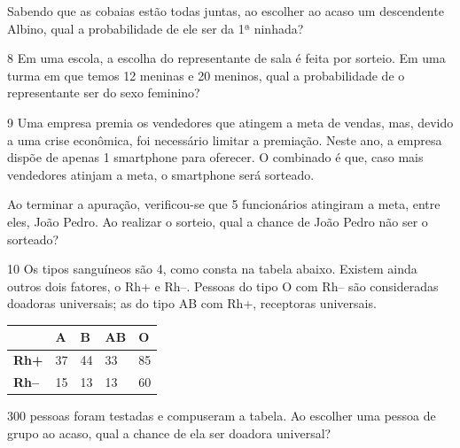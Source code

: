 Sabendo que as cobaias estão todas juntas, ao escolher ao acaso um
descendente Albino, qual a probabilidade de ele ser da 1ª ninhada?

\begin{emptybox}
\end{emptybox}

\num{8} Em uma escola, a escolha do representante de sala é feita por sorteio.
Em uma turma em que temos 12 meninas e 20 meninos, qual a probabilidade
de o representante ser do sexo feminino?

\begin{emptybox}
\end{emptybox}

\num{9} Uma empresa premia os vendedores que atingem a meta de
vendas, mas, devido a uma crise econômica, foi necessário limitar a 
premiação. Neste ano, a empresa dispõe de apenas 1 smartphone para 
oferecer. O combinado é que, caso mais vendedores atinjam 
a meta, o smartphone será sorteado.

Ao terminar a apuração, verificou-se que 5 funcionários atingiram a
meta, entre eles, João Pedro. Ao realizar o sorteio, qual a chance de
João Pedro não ser o sorteado?

\begin{emptybox}
\end{emptybox}

\num{10} Os tipos sanguíneos são 4, como consta na tabela abaixo. Existem ainda
outros dois fatores, o Rh+ e Rh--. Pessoas do tipo O com Rh-- são consideradas 
doadoras universais; as do tipo AB com Rh+, receptoras universais.

\begin{longtable}[]{@{}lllll@{}}
\toprule
& \textbf{A} & \textbf{B} & \textbf{AB} & \textbf{O}\tabularnewline
\midrule
\endhead
\textbf{Rh+} & 37 & 44 & 33 & 85\tabularnewline
\textbf{Rh--} & 15 & 13 & 13 & 60\tabularnewline
\bottomrule
\end{longtable}

300 pessoas foram testadas e compuseram a tabela. Ao escolher uma pessoa
de grupo ao acaso, qual a chance de ela ser doadora universal?

